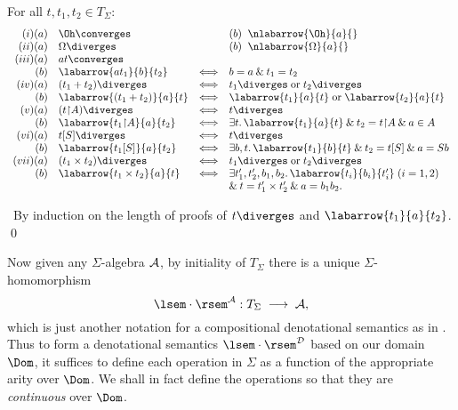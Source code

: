 \begin{proposition}
\label{tops}
For all $t, t_{1}, t_{2} \in T_{\Sigma}$:
\[ \begin{array}{rlcl}
(i) (a) & \Oh \converges & & (b) \;\; \nlabarrow{\Oh}{a}{} \\
(ii) (a) & \Omega \diverges & & (b) \;\; \nlabarrow{\Omega}{a}{} \\
(iii) (a) & at \converges \\
(b) & \labarrow{at_{1}}{b}{t_{2}} & \Longleftrightarrow & b = a \: \& \: t_{1} = t_{2} \\
(iv) (a) & (t_{1} + t_{2}) \diverges & \Longleftrightarrow & t_{1} \diverges \;  {\rm or} \; t_{2} \diverges \\
(b) & \labarrow{(t_{1} + t_{2})}{a}{t} & \Longleftrightarrow & \labarrow{t_{1}}{a}{t} \; {\rm or} \; \labarrow{t_{2}}{a}{t} \\
(v) (a) & (t {\restriction} A) \diverges & \Longleftrightarrow & t \diverges \\
(b) & \labarrow{t_{1} {\restriction} A}{a}{t_{2}} & \Longleftrightarrow & \exists t . \, \labarrow{t_{1}}{a}{t} \: \& \: t_{2} = t {\restriction} A \: \& \: a \in A \\
(vi) (a) & t[S] \diverges & \Longleftrightarrow & t \diverges \\
(b) & \labarrow{t_{1}[S]}{a}{t_{2}} & \Longleftrightarrow & \exists b, t . \, \labarrow{t_{1}}{b}{t} \: \& \: t_{2} = t[S] \: \& \:  a = Sb \\
(vii) (a) & (t_{1} \times t_{2}) \diverges & \Longleftrightarrow & t_{1} \diverges \;  {\rm or} \; t_{2} \diverges \\
(b) & \labarrow{t_{1} \times t_{2}}{a}{t} & \Longleftrightarrow & \exists t'_{1}, t'_{2}, b_{1}, b_{2} . \, \labarrow{t_{i}}{b_{i}}{t'_{i}} \; (i = 1, 2) \\
& & & \& \: t = t'_{1} \times t'_{2} \: \& \: a = b_{1}b_{2} .
\end{array} \]
\end{proposition}

\proof\ By induction on the length of proofs of $t \diverges$ and $\labarrow{t_{1}}{a}{t_{2}}$. \qed

Now given any $\Sigma$-algebra ${\cal A}$, by initiality of $T_{\Sigma}$ there is a unique $\Sigma$-homomorphism
\[ \lsem \cdot \rsem^{\cal A} : T_{\Sigma} \; \longrightarrow \; {\cal A} , \]
which is just another notation for a compositional denotational semantics as 
in \cite{MS76,Sto77,Gor79}.
Thus to form a denotational semantics $\lsem \cdot \rsem^{\cal D}$ based on our domain $\Dom$, it suffices to define each operation in $\Sigma$ as a function of the appropriate arity over $\Dom$.
We shall in fact define the operations so that they are {\em continuous} over $\Dom$.

